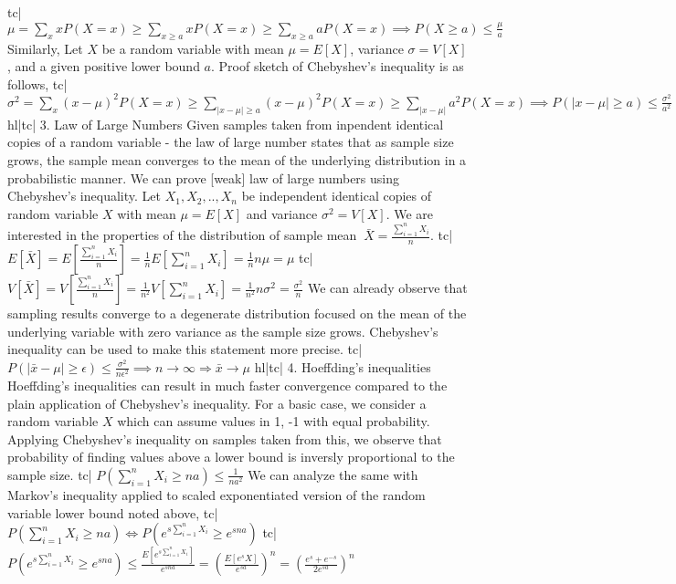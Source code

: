 tc| \( \mu = \sum_x xP(X=x) \ge \sum_{x\ge a}xP(X=x) \ge \sum_{x\ge a} aP(X=x) \implies P(X\ge a) \le \frac{\mu}{a} \)
Similarly, Let \(X\) be a random variable with mean \(\mu=E[X]\), variance \(\sigma=V[X]\), and a given positive lower bound \(a\). Proof sketch of Chebyshev's inequality is as follows,
tc| \( \sigma^2 = \sum_x (x - \mu)^2 P(X=x) \ge \sum_{|x-\mu| \ge a} (x - \mu)^2 P(X=x) \ge \sum_{|x-\mu|} a^2 P(X=x) \implies P(|x - \mu| \ge a) \le \frac{\sigma^2}{a^2} \)
hl|tc| 3. Law of Large Numbers
Given samples taken from inpendent identical copies of a random variable - the law of large number states that as sample size grows, the sample mean converges to the mean of the underlying distribution in a probabilistic manner. We can prove [weak] law of large numbers using Chebyshev's inequality.
Let \(X_1,X_2,..,X_n\) be independent identical copies of random variable \(X\) with mean \(\mu=E[X]\) and variance \(\sigma^2=V[X]\). We are interested in the properties of the distribution of sample mean \(\ \bar{X} = \frac{\sum_{i=1}^n X_i}{n} \).
tc| \( E[\bar{X}] = E \left[\frac{\sum_{i=1}^nX_i}{n} \right] = \frac{1}{n} E\left[\sum_{i=1}^n X_i \right] = \frac{1}{n} n\mu = \mu \)
tc| \( V[\bar{X}] = V\left[\frac{ \sum_{i=1}^n X_i}{n} \right] = \frac{1}{n^2} V\left[\sum_{i=1}^n X_i \right] = \frac{1}{n^2} n\sigma^2 = \frac{\sigma^2}{n} \)
We can already observe that sampling results converge to a degenerate distribution focused on the mean of the underlying variable with zero variance as the sample size grows. Chebyshev's inequality can be used to make this statement more precise.
tc| \( P(|\bar{x} -\mu| \ge \epsilon) \le \frac{\sigma^2}{n\epsilon^2} \implies n \rightarrow \infty \Rightarrow \bar{x} \rightarrow \mu \)
hl|tc| 4. Hoeffding's inequalities
Hoeffding's inequalities can result in much faster convergence compared to the plain application of Chebyshev's inequality. For a basic case, we consider a random variable \(X\) which can assume values in {1, -1} with equal probability. Applying Chebyshev's inequality on samples taken from this, we observe that probability of finding values above a lower bound is inversly proportional to the sample size.
tc| \( P(\sum_{i=1}^n X_i \ge na) \le \frac{1}{na^2} \)
We can analyze the same with Markov's inequality applied to scaled exponentiated version of the random variable lower bound noted above,
tc| \( P(\sum_{i=1}^n X_i \ge na) \iff P\left(e^{s\sum_{i=1}^nX_i} \ge e^{sna}\right) \)
tc| \( P\left(e^{s\sum_{i=1}^n X_i} \ge e^{sna} \right) \le \frac{E\left[e^{s\sum_{i=1}^n X_i}\right]}{e^{sna}} = \left(\frac{E\left[ e^sX \right]}{e^{sa}} \right)^n = \left( \frac{e^s + e^{-s}}{2e^{sa}} \right)^n \)
